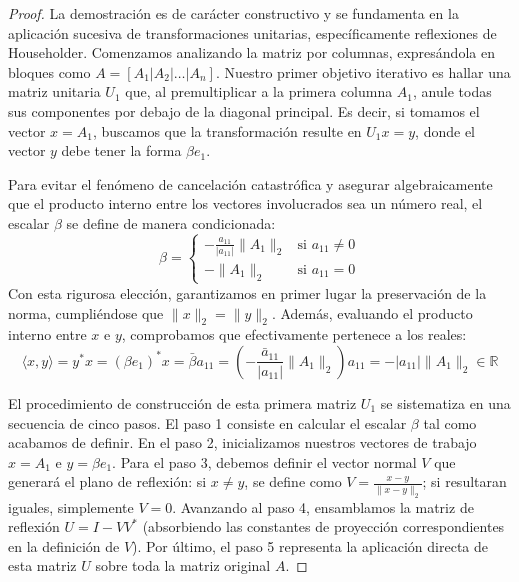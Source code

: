 \documentclass[12pt]{article}
\begin{document}
\begin{proof}
La demostración es de carácter constructivo y se fundamenta en la aplicación sucesiva de transformaciones unitarias, específicamente reflexiones de Householder. Comenzamos analizando la matriz por columnas, expresándola en bloques como $A = [A_1 | A_2 | \dots | A_n]$. Nuestro primer objetivo iterativo es hallar una matriz unitaria $U_1$ que, al premultiplicar a la primera columna $A_1$, anule todas sus componentes por debajo de la diagonal principal. Es decir, si tomamos el vector $x = A_1$, buscamos que la transformación resulte en $U_1 x = y$, donde el vector $y$ debe tener la forma $\beta e_1$.

Para evitar el fenómeno de cancelación catastrófica y asegurar algebraicamente que el producto interno entre los vectores involucrados sea un número real, el escalar $\beta$ se define de manera condicionada:
\begin{equation}
\beta = 
\begin{cases} 
-\frac{a_{11}}{|a_{11}|} \|A_1\|_2 & \text{si } a_{11} \neq 0 \\ 
-\|A_1\|_2 & \text{si } a_{11} = 0 
\end{cases}
\end{equation}
Con esta rigurosa elección, garantizamos en primer lugar la preservación de la norma, cumpliéndose que $\|x\|_2 = \|y\|_2$. Además, evaluando el producto interno entre $x$ e $y$, comprobamos que efectivamente pertenece a los reales:
\begin{equation}
\langle x, y \rangle = y^* x = (\beta e_1)^* x = \bar{\beta} a_{11} = \left( -\frac{\bar{a}_{11}}{|a_{11}|} \|A_1\|_2 \right) a_{11} = -|a_{11}| \|A_1\|_2 \in \mathbb{R}
\end{equation}

El procedimiento de construcción de esta primera matriz $U_1$ se sistematiza en una secuencia de cinco pasos. El paso 1 consiste en calcular el escalar $\beta$ tal como acabamos de definir. En el paso 2, inicializamos nuestros vectores de trabajo $x = A_1$ e $y = \beta e_1$. Para el paso 3, debemos definir el vector normal $V$ que generará el plano de reflexión: si $x \neq y$, se define como $V = \frac{x-y}{\|x-y\|_2}$; si resultaran iguales, simplemente $V = 0$. Avanzando al paso 4, ensamblamos la matriz de reflexión $U = I - V V^*$ (absorbiendo las constantes de proyección correspondientes en la definición de $V$). Por último, el paso 5 representa la aplicación directa de esta matriz $U$ sobre toda la matriz original $A$.


\end{proof}
\end{document}
